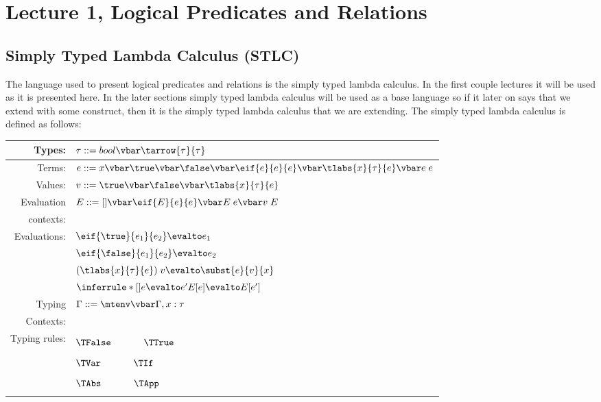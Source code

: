 \section*{Lecture 1, Logical Predicates and Relations}
\subsection*{Simply Typed Lambda Calculus (STLC)}
The language used to present logical predicates and relations is the simply typed lambda calculus. In the first couple lectures it will be used as it is presented here. In the later sections simply typed lambda calculus will be used as a base language so if it later on says that we extend with some construct, then it is the simply typed lambda calculus that we are extending. The simply typed lambda calculus is defined as follows:\\
\begin{tabular}{ r | l }
  Types: & $\tau ::=  bool \vbar \tarrow{\tau}{\tau}$ \\
  \hline
  Terms: & $e    ::= x \vbar \true
                       \vbar \false
                       \vbar \eif{e}{e}{e}
                       \vbar \tlabs{x}{\tau }{e}
                       \vbar e \; e$ \\
  \hline
  Values: & $v    ::= \true \vbar \false \vbar \tlabs{x}{\tau}{e}$ \\
  \hline
  Evaluation  & \multirow{2}{*}{$E    ::= [] \vbar \eif{E}{e}{e} \vbar E \; e \vbar v \; E$}\\
  contexts: & \\
  \hline
  \multirow{4}{*}{Evaluations:}
                                   & $\eif{\true}{e_1}{e_2} \evalto e_1$ \\
                                   & $\eif{\false}{e_1}{e_2} \evalto e_2$ \\
                                   & $(\tlabs{x}{\tau}{e}) \; v \evalto \subst{e}{v}{x}$ \\
                                   & $\inferrule*[]{e \evalto e'}
                                                   {E[e] \evalto E[e']}$ \\
  \hline
  Typing & \multirow{2}{*}{$ \Gamma ::= \mtenv \vbar \Gamma , x : \tau$} \\
  Contexts: & \\
  \hline
  \multirow{8}{*}{Typing rules:} & \\
                                 & $\TFalse \hspace{1.2cm} \TTrue$ \\
                                 & \\
                                 & $\TVar \hspace{1.2cm} \TIf$ \\
                                 & \\
                                 & $\TAbs \hspace{1.2cm} \TApp$\\
                                 & \\
\end{tabular}\\
